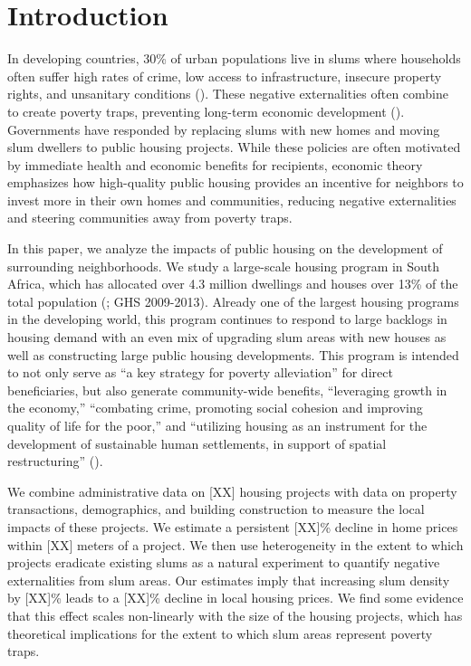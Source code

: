 \documentclass[12pt]{article}
\begin{document}
\section{Introduction} \label{sec:introduction}


In developing countries, 30\% of urban populations live in slums where households often suffer high rates of crime, low access to infrastructure, insecure property rights, and unsanitary conditions (\cite{mdg}).  These negative externalities often combine to create poverty traps, preventing long-term economic development (\cite{10.1257/jep.27.4.187}). Governments have responded by replacing slums with new homes and moving slum dwellers to public housing projects.  While these policies are often motivated by immediate health and economic benefits for recipients, economic theory emphasizes how high-quality public housing provides an incentive for neighbors to invest more in their own homes and communities, reducing negative externalities and steering communities away from poverty traps.

In this paper, we analyze the impacts of public housing on the development of surrounding neighborhoods.  We study a large-scale housing program in South Africa, which has allocated over 4.3 million dwellings and houses over 13\% of the total population (\cite{dhsreports}; GHS 2009-2013).  Already one of the largest housing programs in the developing world, this program continues to respond to large backlogs in housing demand with an even mix of upgrading slum areas with new houses as well as constructing large public housing developments.  This program is intended to not only serve as ``a key strategy for poverty alleviation'' for direct beneficiaries, but also generate community-wide benefits, ``leveraging growth in the economy,'' ``combating crime, promoting social cohesion and improving quality of life for the poor,'' and ``utilizing housing as an instrument for the development of sustainable human settlements, in support of spatial restructuring'' (\cite{bng}). 

We combine administrative data on [XX] housing projects with data on property transactions, demographics, and building construction to measure the local impacts of these projects.  We estimate a persistent [XX]\% decline in home prices within [XX] meters of a project.  We then use heterogeneity in the extent to which projects eradicate existing slums as a natural experiment to quantify negative externalities from slum areas.  Our estimates imply that increasing slum density by [XX]\% leads to a [XX]\% decline in local housing prices.  We find some evidence that this effect scales non-linearly with the size of the housing projects, which has theoretical implications for the extent to which slum areas represent poverty traps.
\end{document}
